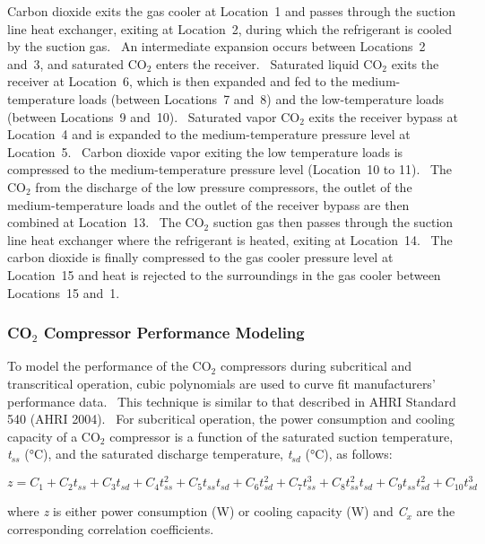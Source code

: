 Carbon dioxide exits the gas cooler at Location~1 and passes through the suction line heat exchanger, exiting at Location~2, during which the refrigerant is cooled by the suction gas.~ An intermediate expansion occurs between Locations~2 and~3, and saturated CO\(_{2}\) enters the receiver.~ Saturated liquid CO\(_{2}\) exits the receiver at Location~6, which is then expanded and fed to the medium-temperature loads (between Locations~7 and~8) and the low-temperature loads (between Locations~9 and~10).~ Saturated vapor CO\(_{2}\) exits the receiver bypass at Location~4 and is expanded to the medium-temperature pressure level at Location~5.~ Carbon dioxide vapor exiting the low temperature loads is compressed to the medium-temperature pressure level (Location~10 to 11).~ The CO\(_{2}\) from the discharge of the low pressure compressors, the outlet of the medium-temperature loads and the outlet of the receiver bypass are then combined at Location~13.~ The CO\(_{2}\) suction gas then passes through the suction line heat exchanger where the refrigerant is heated, exiting at Location~14.~ The carbon dioxide is finally compressed to the gas cooler pressure level at Location~15 and heat is rejected to the surroundings in the gas cooler between Locations~15 and~1.

\subsubsection{\texorpdfstring{CO\(_{2}\) Compressor Performance Modeling}{CO\_\{2\} Compressor Performance Modeling}}\label{coux5f2-compressor-performance-modeling}

To model the performance of the CO\(_{2}\) compressors during subcritical and transcritical operation, cubic polynomials are used to curve fit manufacturers' performance data.~ This technique is similar to that described in AHRI Standard 540 (AHRI 2004).~ For subcritical operation, the power consumption and cooling capacity of a CO\(_{2}\) compressor is a function of the saturated suction temperature, \emph{t\(_{ss}\)} (°C), and the saturated discharge temperature, \emph{t\(_{sd}\)} (°C), as follows:

\begin{equation}
z = {C_1} + {C_2}{t_{ss}} + {C_3}{t_{sd}} + {C_4}t_{ss}^2 + {C_5}{t_{ss}}{t_{sd}} + {C_6}t_{sd}^2 + {C_7}t_{ss}^3 + {C_8}t_{ss}^2{t_{sd}} + {C_9}{t_{ss}}t_{sd}^2 + {C_{10}}t_{sd}^3
\end{equation}

where \emph{z} is either power consumption (W) or cooling capacity (W) and \emph{C\(_{x}\)} are the corresponding correlation coefficients.

